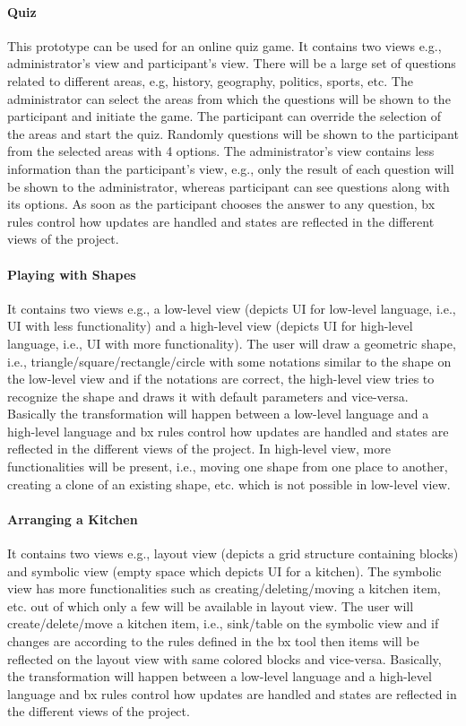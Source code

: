 \paragraph{Quiz} This prototype can be used for an online quiz game. It contains two views e.g., administrator's view and participant's view.
There will be a large set of questions related to different areas, e.g, history, geography, politics, sports, etc. The administrator can select the areas from which the questions will be shown to the participant and initiate the game. The participant can override the selection of the areas and start the quiz. Randomly questions will be shown to the participant from the selected areas with 4 options. The administrator's view contains less information than the participant's view, e.g., only the result of each question will be shown to the administrator, whereas participant can see questions along with its options. As soon as the participant chooses the answer to any question, bx rules control how updates are handled and states are reflected in the different views of the project.

\paragraph{Playing with Shapes} It contains two views e.g., a low-level view (depicts \ac{UI} for low-level language, i.e., UI with less functionality) and a high-level view (depicts UI for high-level language, i.e., UI with more functionality). The user will draw a geometric shape, i.e., triangle/square/rectangle/circle with some notations similar to the shape on the low-level view and if the notations are correct, the high-level view tries to recognize the shape and draws it with default parameters and vice-versa. Basically the transformation will happen between a low-level language and a high-level language and bx rules control how updates are handled and states are reflected in the different views of the project. In high-level view, more functionalities will be present, i.e., moving one shape from one place to another, creating a clone of an existing shape, etc. which is not possible in low-level view.

\paragraph{Arranging a Kitchen}
It contains two views e.g., layout view (depicts a grid structure containing blocks) and symbolic view (empty space which depicts UI for a kitchen). The symbolic view has more functionalities such as creating/deleting/moving a kitchen item, etc. out of which only a few will be available in layout view. The user will create/delete/move a kitchen item, i.e., sink/table on the symbolic view and if changes are according to the rules defined in the bx tool then items will be reflected on the layout view with same colored blocks and vice-versa. Basically, the transformation will happen between a low-level language and a high-level language and bx rules control how updates are handled and states are reflected in the different views of the project.

